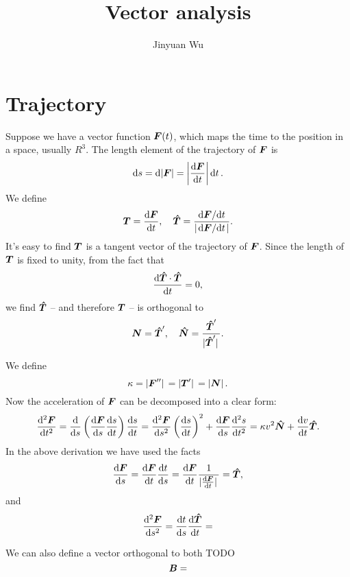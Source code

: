 \documentclass[hyperref, a4paper]{article}
\title{Vector analysis}
\author{Jinyuan Wu}
\def\mathbb#1{#1}%
\begin{document}
\maketitle

\section{Trajectory}

Suppose we have a vector function $\vb*{F}(t)$,
which maps the time to the position in a space, 
usually $\mathbb{R}^3$.
The length element of the trajectory of $\vb*{F}$ is 
\begin{equation}
    \dd{s} = \dd{\abs{\vb*{F}}} = \abs{\dv{\vb*{F}}{t}} \dd{t}.
\end{equation}
We define 
\begin{equation}
    \vb*{T} = \dv{\vb*{F}}{t} , \quad \vu*{T} = \frac{\dv*{\vb*{F}}{t}}{\abs{\dv*{\vb*{F}}{t}}}.
\end{equation}
It's easy to find $\vb*{T}$ is a tangent vector 
of the trajectory of $\vb*{F}$.
Since the length of $\vb*{T}$ is fixed to unity, 
from the fact that 
\[
    \dv{\vu*{T} \cdot \vu*{T}}{t} = 0,
\]
we find $\vu*{T}$ -- and therefore $\vb*{T}$ -- is orthogonal to 
\begin{equation}
    \vb*{N} = \vu*{T}' , \quad \vu*{N} = \frac{\vu*{T}'}{\abs*{\vu*{T}'}}.
\end{equation}

We define 
\begin{equation}
    \kappa = \abs*{\vb*{F}''} = \abs*{\vb*{T}'} = \abs*{\vb*{N}}.
\end{equation}
Now the acceleration of $\vb*{F}$ can be decomposed into a clear form: 
\begin{equation}
    \dv[2]{\vb*{F}}{t} = \dv{s} \left(
        \dv{\vb*{F}}{s} \dv{s}{t}
    \right) \dv{s}{t}
    = \dv[2]{\vb*{F}}{s} \left(\dv{s}{t}\right)^2 
    + \dv{\vb*{F}}{s} \dv[2]{s}{t}
    = \kappa v^2 \vu*{N} + \dv{v}{t} \vu*{T}.
\end{equation}
In the above derivation we have used the facts 
\begin{equation}
    \dv{\vb*{F}}{s} = \dv{\vb*{F}}{t} \dv{t}{s} = \dv{\vb*{F}}{t} \frac{1}{\abs*{\dv{\vb*{F}}{t}}}
    = \vu*{T},
\end{equation}
and 
\begin{equation}
    \dv[2]{\vb*{F}}{s} = \dv{t}{s} \dv{\vu*{T}}{t} =  
\end{equation}

We can also define a vector orthogonal to both TODO
\begin{equation}
    \vb*{B} = 
\end{equation}
\end{document}
